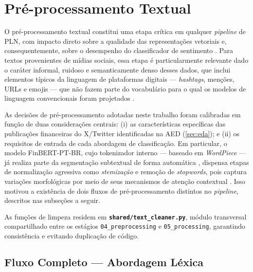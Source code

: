 
\section{Pré-processamento Textual}
\label{sec:preprocessamento}

O pré-processamento textual constitui uma etapa crítica em qualquer \textit{pipeline} de PLN, com impacto direto sobre a qualidade das representações vetoriais e, consequentemente, sobre o desempenho do classificador de sentimento \cite{caseli2024cap1}. Para textos provenientes de mídias sociais, essa etapa é particularmente relevante dado o caráter informal, ruidoso e semanticamente denso desses dados, que inclui elementos típicos da linguagem de plataformas digitais — \textit{hashtags}, menções, URLs e emojis — que não fazem parte do vocabulário para o qual os modelos de linguagem convencionais foram projetados \cite{santana2024cap34}.

As decisões de pré-processamento adotadas neste trabalho foram calibradas em função de duas considerações centrais: (i) as características específicas das publicações financeiras do X/Twitter identificadas na AED (\autoref{sec:eda}); e (ii) os requisitos de entrada de cada abordagem de classificação. Em particular, o modelo FinBERT-PT-BR, cujo tokenizador interno — baseado em \textit{WordPiece} — já realiza parte da segmentação subtextual de forma automática \cite{santos2023finbert,devlin2019}, dispensa etapas de normalização agressiva como \textit{stemização} e remoção de \textit{stopwords}, pois captura variações morfológicas por meio de seus mecanismos de atenção contextual \cite{jurafsky2026}. Isso motivou a existência de dois fluxos de pré-processamento distintos no \textit{pipeline}, descritos nas subseções a seguir.

As funções de limpeza residem em \textbf{\texttt{shared/text\_cleaner.py}}, módulo transversal compartilhado entre os estágios \texttt{04\_preprocessing} e \texttt{05\_processing}, garantindo consistência e evitando duplicação de código.

\subsection{Fluxo Completo — Abordagem Léxica}
\label{subsec:fluxo_lexico}

